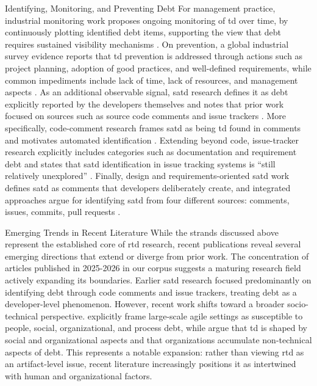 \documentclass[12pt,reqno, twoside]{amsbook}
\makeatletter
\def\section{\@startsection{section}{1}%
      \z@{.5\linespacing\@plus.7\linespacing}{.25\linespacing}%
      {\normalfont\bfseries\flushleft}}
\theoremstyle{plain}
\numberwithin{equation}{chapter}
\numberwithin{section}{chapter}
\makeatother
\begin{document}
\section{Identifying, Monitoring, and Preventing Debt}
\noindent For management practice, industrial monitoring work proposes ongoing monitoring of \gls{td} over time, by continuously plotting identified debt items, supporting the view that debt requires sustained visibility mechanisms \parencite{Arvanitou2019}. On prevention, a global industrial survey evidence reports that \gls{td} prevention is addressed through actions such as project planning, adoption of good practices, and well-defined requirements, while common impediments include lack of time, lack of resources, and management aspects \parencite{Freire2020}. As an additional observable signal, \gls{satd} research defines it as debt explicitly reported by the developers themselves and notes that prior work focused on sources such as source code comments and issue trackers \parencite{Li2023}. More specifically, code-comment research frames \gls{satd} as being \gls{td} found in comments and motivates automated identification \parencite{Farias2020}. Extending beyond code, issue-tracker research explicitly includes categories such as documentation and requirement debt and states that \gls{satd} identification in issue tracking systems is ``still relatively unexplored'' \parencite{Li2020}. Finally, design and requirements-oriented \gls{satd} work defines \gls{satd} as comments that developers deliberately create, and integrated approaches argue for identifying \gls{satd} from four different sources: comments, issues, commits, pull requests \parencite{Wattanakriengkrai2018,Li2023}.

\section{Emerging Trends in Recent Literature}
\noindent While the strands discussed above represent the established core of \gls{rtd} research, recent publications reveal several emerging directions that extend or diverge from prior work. The concentration of articles published in 2025-2026 in our corpus suggests a maturing research field actively expanding its boundaries. Earlier \gls{satd} research focused predominantly on identifying debt through code comments and issue trackers, treating debt as a developer-level phenomenon. However, recent work shifts toward a broader socio-technical perspective. \textcite{Herath2025b} explicitly frame large-scale agile settings as susceptible to people, social, organizational, and process debt, while \textcite{Ahmad2026} argue that \gls{td} is shaped by social and organizational aspects and that organizations accumulate non-technical aspects of debt. This represents a notable expansion: rather than viewing \gls{rtd} as an artifact-level issue, recent literature increasingly positions it as intertwined with human and organizational factors.
\end{document}
